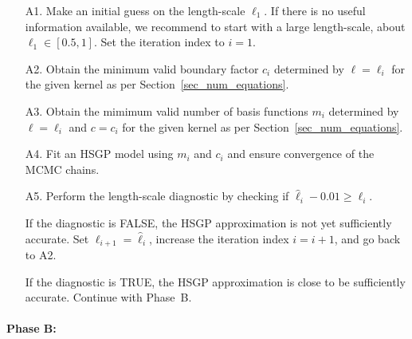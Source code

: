 \begin{enumerate}

\item[A1.] Make an initial guess on the length-scale $\ell_1$. If there is no useful information available, we recommend to start with a large length-scale, about $\ell_1 \in [0.5, 1]$. Set the iteration index to $i=1$.

\item[A2.] Obtain the minimum valid boundary factor $c_i$ determined by $\ell = \ell_i$ for the given kernel as per Section~\ref{sec_num_equations}.

\item[A3.] Obtain the mimimum valid number of basis functions $m_i$ determined by $\ell = \ell_i$ and $c = c_i$ for the given kernel as per Section~\ref{sec_num_equations}. 

\item[A4.] Fit an HSGP model using $m_i$ and $c_i$ and ensure convergence of the MCMC chains.

\item[A5.] Perform the length-scale diagnostic by checking if $\hat{\ell}_i - 0.01 \geq \ell_i$. 

If the diagnostic is FALSE, the HSGP approximation is not yet sufficiently accurate. Set $\ell_{i+1} = \hat{\ell}_{i}$, increase the iteration index $i = i + 1$, and go back to A2.

If the diagnostic is TRUE, the HSGP approximation is close to be sufficiently accurate. Continue with Phase~B.

\end{enumerate}

\paragraph*{Phase B:}

